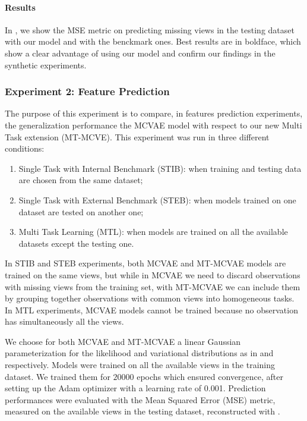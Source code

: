 \paragraph{Results}
In , we show the MSE metric on predicting missing views in the testing dataset with our model and with the benckmark ones.
Best results are in boldface, which show a clear advantage of using our model and confirm our findings in the synthetic experiments.

\subsubsection{Experiment 2: Feature Prediction}
\label{ssec:feats}

The purpose of this experiment is to compare, in features prediction experiments, the generalization performance the MCVAE model with respect to our new Multi Task extension (MT-MCVE).
This experiment was run in three different conditions:
%
\begin{enumerate}
\item Single Task with Internal Benchmark (STIB): when training and testing data are chosen from the same dataset;
%
\item Single Task with External Benchmark (STEB): when models trained on one dataset are tested on another one;
%
\item Multi Task Learning (MTL): when models are trained on all the available datasets except the testing one.
%
\end{enumerate}
%
In STIB and STEB experiments, both MCVAE and MT-MCVAE models are trained on the same views,
but while in MCVAE we need to discard observations with missing views from the training set,
with MT-MCVAE we can include them by grouping together observations with common views into homogeneous tasks.
In MTL experiments, MCVAE models cannot be trained because no observation has simultaneously all the views.

We choose for both MCVAE and MT-MCVAE a linear Gaussian parameterization for the likelihood and variational distributions as in  and  respectively.
Models were trained on all the available views in the training dataset. %
We trained them for $20000$ epochs which ensured convergence, after setting up the Adam optimizer with a learning rate of 0.001.
Prediction performances were evaluated with the Mean Squared Error (MSE) metric, measured on the available views in the testing dataset, reconstructed with .

